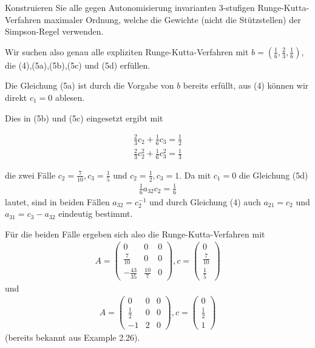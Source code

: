 \begin{exercise}

Konstruieren Sie alle gegen Autonomisierung invarianten 3-stufigen Runge-Kutta-Verfahren maximaler Ordnung, welche die Gewichte (nicht die Stützstellen) der Simpson-Regel verwenden.

\end{exercise}

\begin{solution}

Wir suchen also genau alle expliziten Runge-Kutta-Verfahren mit $b = (\frac{1}{6},\frac{2}{3},\frac{1}{6})$, die (4),(5a),(5b),(5c) und (5d) erfüllen.

Die Gleichung (5a) ist durch die Vorgabe von $b$ bereits erfüllt, aus (4) können wir direkt $c_{1}=0$ ablesen.

Dies in (5b) und (5c) eingesetzt ergibt mit

\begin{align*}
    \frac{2}{3}c_{2} + \frac{1}{6}c_{3} = \frac{1}{2} \\
    \frac{2}{3}c_{2}^{2} + \frac{1}{6}c_{3}^{2} = \frac{1}{3}
\end{align*}

die zwei Fälle $c_{2}=\frac{7}{10}, c_{3}=\frac{1}{5}$ und $c_{2}=\frac{1}{2}, c_{3}=1$.
Da mit $c_{1}=0$ die Gleichung (5d)
\begin{align*}
    \frac{1}{6}a_{32}c_{2}=\frac{1}{6}
\end{align*}
lautet, sind in beiden Fällen $a_{32}=c_{2}^{-1}$ und durch Gleichung (4) auch $a_{21}=c_{2}$ und $a_{31}=c_{3}-a_{32}$ eindeutig bestimmt.

Für die beiden Fälle ergeben sich also die Runge-Kutta-Verfahren mit
\begin{align*}
    A = \left( \begin{array}{rrr}
         0 & 0 & 0 \\
        \frac{7}{10} & 0 & 0 \\
        -\frac{43}{35} & \frac{10}{7} & 0
    \end{array} \right) , c = \begin{pmatrix}
    0 \\ \frac{7}{10} \\ \frac{1}{5}
    \end{pmatrix}
\end{align*}
und
\begin{align*}
    A = \left( \begin{array}{rrr}
         0 & 0 & 0 \\
        \frac{1}{2} & 0 & 0 \\
        -1 & 2 & 0
    \end{array} \right) , c = \begin{pmatrix}
    0 \\ \frac{1}{2} \\ 1
    \end{pmatrix}
\end{align*}
(bereits bekannt aus Example 2.26).
\end{solution}
